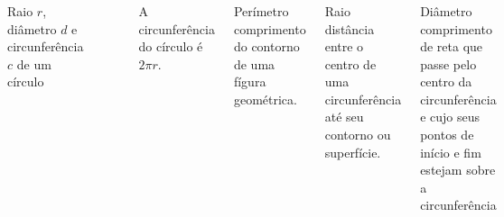 \documentclass{beamer}
\begin{document}

\begin{frame}\frametitle{\subsecname}
    \begin{columns}
        \begin{figure}[H]
            \centering
            \caption{Raio $r$, diâmetro $d$ e circunferência $c$ de um círculo}
        \end{figure}

        A circunferência do círculo é $2\pi r$.

        \begin{block}{Perímetro}
            comprimento do contorno de uma fígura geométrica. \\
        \end{block}

        \begin{block}{Raio}
            distância entre o centro de uma circunferência até seu contorno ou superfície.
        \end{block}

        \begin{block}{Diâmetro}
            comprimento de reta que passe pelo centro da circunferência e cujo seus pontos de início e fim estejam sobre a circunferência
        \end{block}


    \end{columns}

\end{frame}

\end{document}
